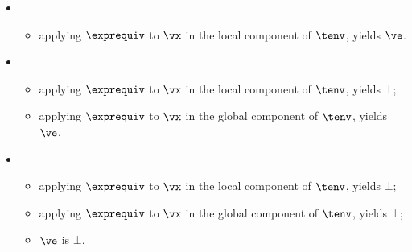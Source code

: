 \ProseParagraph
\OneApplies
\begin{itemize}
  \item {}
  \begin{itemize}
    \item applying $\exprequiv$ to $\vx$ in the local component of $\tenv$, yields $\ve$.
  \end{itemize}

  \item {}
  \begin{itemize}
    \item applying $\exprequiv$ to $\vx$ in the local component of $\tenv$, yields $\bot$;
    \item applying $\exprequiv$ to $\vx$ in the global component of $\tenv$, yields $\ve$.
  \end{itemize}

  \item {}
  \begin{itemize}
    \item applying $\exprequiv$ to $\vx$ in the local component of $\tenv$, yields $\bot$;
    \item applying $\exprequiv$ to $\vx$ in the global component of $\tenv$, yields $\bot$;
    \item $\ve$ is $\bot$.
  \end{itemize}
\end{itemize}
\FormallyParagraph
\begin{mathpar}
\end{mathpar}

\begin{mathpar}
\end{mathpar}

\begin{mathpar}
\end{mathpar}


